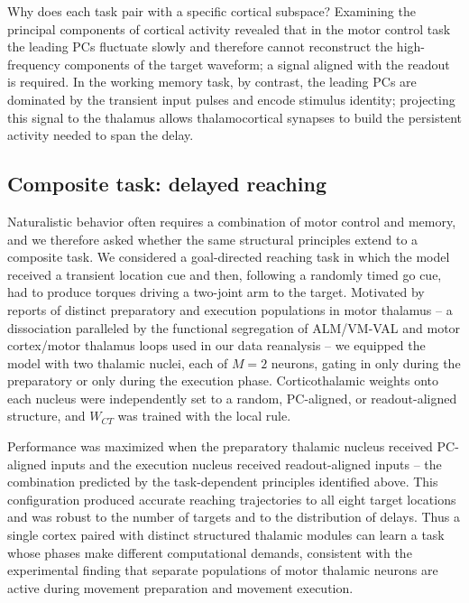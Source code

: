 \documentclass[11pt]{article}
\begin{document}
Why does each task pair with a specific cortical subspace? Examining the
principal components of cortical activity revealed that in the motor
control task the leading PCs fluctuate slowly and therefore cannot
reconstruct the high-frequency components of the target waveform; a
signal aligned with the readout is required. In the working memory
task, by contrast, the leading PCs are dominated by the transient
input pulses and encode stimulus identity; projecting this signal to
the thalamus allows thalamocortical synapses to build the persistent
activity needed to span the delay.

\subsection{Composite task: delayed reaching}

Naturalistic behavior often requires a combination of motor control
and memory, and we therefore asked whether the same structural
principles extend to a composite task. We considered a goal-directed
reaching task in which the model received a transient location cue and
then, following a randomly timed go cue, had to produce torques
driving a two-joint arm to the target. Motivated by reports of
distinct preparatory and execution populations in motor thalamus -- a
dissociation paralleled by the functional segregation of ALM/VM-VAL
\cite{guo2017maintenance} and motor cortex/motor thalamus
\cite{sauerbrei2020cortical} loops used in our data reanalysis -- we
equipped the model with two thalamic nuclei, each of $M = 2$ neurons,
gating in only during the preparatory or only during the execution
phase. Corticothalamic weights onto each nucleus were independently
set to a random, PC-aligned, or readout-aligned structure, and
$W_{CT}$ was trained with the local rule.

Performance was maximized when the preparatory thalamic nucleus
received PC-aligned inputs and the execution nucleus received
readout-aligned inputs -- the combination predicted by the
task-dependent principles identified above. This configuration
produced accurate reaching trajectories to all eight target locations
and was robust to the number of targets and to the distribution of
delays. Thus a single cortex paired with distinct structured thalamic
modules can learn a task whose phases make different computational
demands, consistent with the experimental finding that separate
populations of motor thalamic neurons are active during movement
preparation and movement execution.
\end{document}
